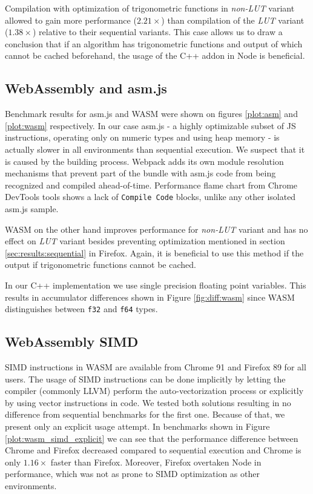 


Compilation with optimization of trigonometric functions in \textit{non-LUT} variant allowed to gain more performance ($2.21\times$) than compilation of the \textit{LUT} variant ($1.38\times$) relative to their sequential variants. This case allows us to draw a conclusion that if an algorithm has trigonometric functions and output of which cannot be cached beforehand, the usage of the C++ addon in Node is beneficial.

\subsection{WebAssembly and asm.js}\label{sec:results:asm-wasm}

Benchmark results for asm.js and WASM were shown on figures \ref{plot:asm} and \ref{plot:wasm} respectively. In our case asm.js - a highly optimizable subset of JS instructions, operating only on numeric types and using heap memory - is actually slower in all environments than sequential execution. We suspect that it is caused by the building process. Webpack adds its own module resolution mechanisms that prevent part of the bundle with asm.js code from being recognized and compiled ahead-of-time. Performance flame chart from Chrome DevTools tools shows a lack of \texttt{Compile Code} blocks, unlike any other isolated asm.js sample.

WASM on the other hand improves performance for \textit{non-LUT} variant and has no effect on \textit{LUT} variant besides preventing optimization mentioned in section \ref{sec:results:sequential} in Firefox. Again, it is beneficial to use this method if the output if trigonometric functions cannot be cached.

In our C++ implementation we use single precision floating point variables. This results in accumulator differences shown in Figure \ref{fig:diff:wasm} since WASM distinguishes between \texttt{f32} and \texttt{f64} types.






\subsection{WebAssembly SIMD}

SIMD instructions in WASM are available from Chrome 91 and Firefox 89 for all users. The usage of SIMD instructions can be done implicitly by letting the compiler (commonly LLVM) perform the auto-vectorization process or explicitly by using vector instructions in code. We tested both solutions resulting in no difference from sequential benchmarks for the first one. Because of that, we present only an explicit usage attempt. In benchmarks shown in Figure \ref{plot:wasm_simd_explicit} we can see that the performance difference between Chrome and Firefox decreased compared to sequential execution and Chrome is only $1.16\times$ faster than Firefox. Moreover, Firefox overtaken Node in performance, which was not as prone to SIMD optimization as other environments.

